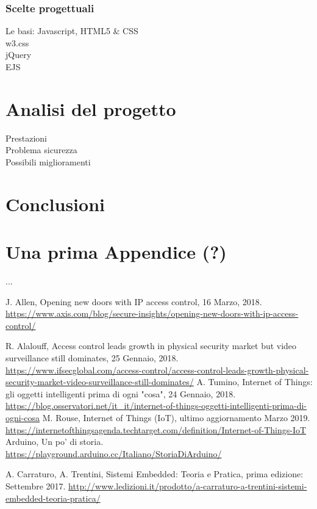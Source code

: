 \documentclass[12pt]{report}
\begin{document}
\subsection*{Scelte progettuali}
Le basi: Javascript, HTML5 \& CSS
\\
w3.css
\\
jQuery
\\
EJS
\\
%
% 
\chapter{Analisi del progetto}
\label{cap4}
Prestazioni
\\
Problema sicurezza
\\
Possibili miglioramenti
\\
%
% 
\chapter{Conclusioni}


\label{cap5}
%
%

\appendix
\chapter{Una prima Appendice (?)}
...

%
%
\begin{thebibliography}{00}
	

J. Allen, Opening new doors with IP access control, 16 Marzo, 2018. \url{https://www.axis.com/blog/secure-insights/opening-new-doors-with-ip-access-control/}
%

R. Alalouff, Access control leads growth in physical security market but video surveillance still dominates, 25 Gennaio, 2018.
\url{https://www.ifsecglobal.com/access-control/access-control-leads-growth-physical-security-market-video-surveillance-still-dominates/}
%
A. Tumino, Internet of Things: gli oggetti intelligenti prima di ogni "cosa", 24 Gennaio, 2018.
\url{https://blog.osservatori.net/it_it/internet-of-things-oggetti-intelligenti-prima-di-ogni-cosa}
%
M. Rouse, Internet of Things (IoT), ultimo aggiornamento Marzo 2019.
\url{https://internetofthingsagenda.techtarget.com/definition/Internet-of-Things-IoT}
% 
Arduino, Un po' di storia.
\url{https://playground.arduino.cc/Italiano/StoriaDiArduino/}
%

A. Carraturo, A. Trentini, Sistemi Embedded: Teoria e Pratica, prima edizione: Settembre 2017.
\url{http://www.ledizioni.it/prodotto/a-carraturo-a-trentini-sistemi-embedded-teoria-pratica/}
%

\end{thebibliography}
%
\end{document}
